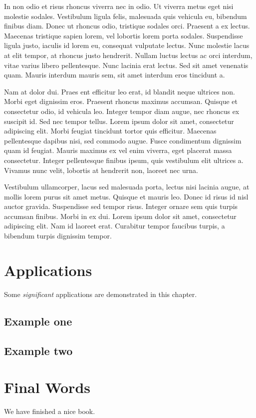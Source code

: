 \documentclass[
  12pt,
  a4paper,
  oneside]{book}
\begin{document}
In non odio et risus rhoncus viverra nec in odio. Ut viverra metus eget nisi molestie sodales. Vestibulum ligula felis, malesuada quis vehicula eu, bibendum finibus diam. Donec ut rhoncus odio, tristique sodales orci. Praesent a ex lectus. Maecenas tristique sapien lorem, vel lobortis lorem porta sodales. Suspendisse ligula justo, iaculis id lorem eu, consequat vulputate lectus. Nunc molestie lacus at elit tempor, at rhoncus justo hendrerit. Nullam luctus lectus ac orci interdum, vitae varius libero pellentesque. Nunc lacinia erat lectus. Sed sit amet venenatis quam. Mauris interdum mauris sem, sit amet interdum eros tincidunt a.

Nam at dolor dui. Praes ent efficitur leo erat, id blandit neque ultrices non. Morbi eget dignissim eros. Praesent rhoncus maximus accumsan. Quisque et consectetur odio, id vehicula leo. Integer tempor diam augue, nec rhoncus ex suscipit id. Sed nec tempor tellus. Lorem ipsum dolor sit amet, consectetur adipiscing elit. Morbi feugiat tincidunt tortor quis efficitur. Maecenas pellentesque dapibus nisi, sed commodo augue. Fusce condimentum dignissim quam id feugiat. Mauris maximus ex vel enim viverra, eget placerat massa consectetur. Integer pellentesque finibus ipsum, quis vestibulum elit ultrices a. Vivamus nunc velit, lobortis at hendrerit non, laoreet nec urna.

Vestibulum ullamcorper, lacus sed malesuada porta, lectus nisi lacinia augue, at mollis lorem purus sit amet metus. Quisque et mauris leo. Donec id risus id nisl auctor gravida. Suspendisse sed tempor risus. Integer ornare sem quis turpis accumsan finibus. Morbi in ex dui. Lorem ipsum dolor sit amet, consectetur adipiscing elit. Nam id laoreet erat. Curabitur tempor faucibus turpis, a bibendum turpis dignissim tempor.

\hypertarget{applications}{%
\chapter{Applications}\label{applications}}

Some \emph{significant} applications are demonstrated in this chapter.

\hypertarget{example-one}{%
\section{Example one}\label{example-one}}

\hypertarget{example-two}{%
\section{Example two}\label{example-two}}

\hypertarget{final-words}{%
\chapter{Final Words}\label{final-words}}

We have finished a nice book.

  
\end{document}
